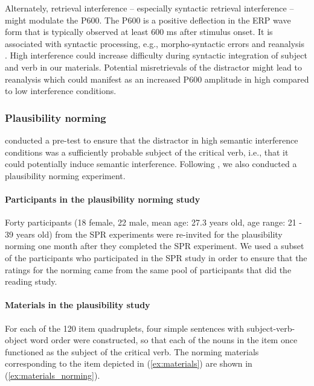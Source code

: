 \documentclass[review,preprint,12pt,authoryear,floatsintext]{elsarticle}
\begin{document}
{Alternately, retrieval interference -- especially syntactic retrieval interference -- might modulate the P600. The P600 is a positive deflection in the ERP wave form that is typically observed at least 600 ms after stimulus onset. It is associated with syntactic processing, e.g., morpho-syntactic errors and reanalysis \citep[see, e.g.,][]{osterhout&holcomb_1992, kaan_etal_2000_P600}. High interference could increase difficulty during syntactic integration of subject and verb in our materials. Potential misretrievals of the distractor might lead to reanalysis which could manifest as an increased P600 amplitude in high compared to low interference conditions.} \label{why_n400}




\subsubsection*{Plausibility norming} \label{plausib_normin_orig}
\citeauthor{vandyke07} conducted a pre-test to ensure that the distractor in high semantic interference conditions was a sufficiently probable subject of the critical verb, i.e., that it could potentially induce semantic interference. Following \citeauthor{vandyke07}, we also conducted a plausibility norming experiment.

\paragraph{Participants in the plausibility norming study}
Forty participants (18 female, 22 male, mean age: 27.3 years old, age range: 21 - 39 years old) from the SPR experiments were re-invited for the plausibility norming one month after they completed the SPR experiment. We used a subset of the participants who participated in the SPR study in order to ensure that the ratings for the norming came from the same pool of participants that did the reading study.

\paragraph{Materials in the plausibility study}
For each of the 120 item quadruplets, four simple sentences with subject-verb-object word order were constructed, so that each of the nouns in the item once functioned as the subject of the critical verb. The norming materials corresponding to the item depicted in (\ref{ex:materials}) are shown in (\ref{ex:materials_norming}).
\end{document}
